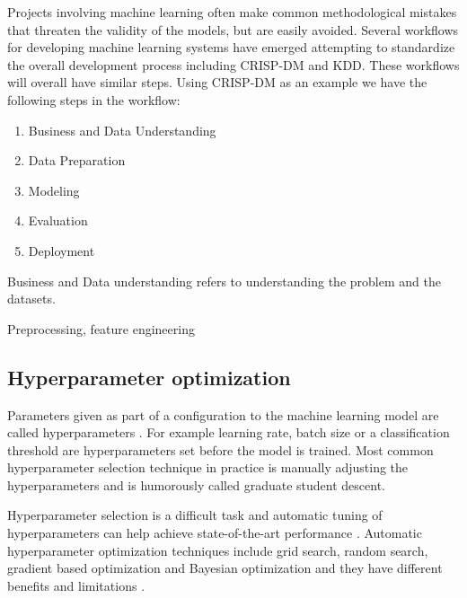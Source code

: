 Projects involving machine learning often make common methodological mistakes that threaten the validity of the models, but are easily avoided. %
Several workflows for developing machine learning systems have emerged attempting to standardize the overall development process including CRISP-DM and KDD. %
These workflows will overall have similar steps. Using CRISP-DM as an example we have the following steps in the workflow: %

\begin{enumerate}
    \item Business and Data Understanding
    \item Data Preparation
    \item Modeling
    \item Evaluation
    \item Deployment
\end{enumerate}



Business and Data understanding refers to understanding the problem and the datasets. %


Preprocessing, feature engineering





\subsection{Hyperparameter optimization}

Parameters given as part of a configuration to the machine learning model are called hyperparameters \parencite{yangHyperparameterOptimizationMachine2020}. 
For example learning rate, batch size or a classification threshold are hyperparameters set before the model is trained. 
Most common hyperparameter selection technique in practice is manually adjusting the hyperparameters and is humorously called graduate student descent. %

Hyperparameter selection is a difficult task and automatic tuning of hyperparameters can help achieve state-of-the-art performance \parencite{maclaurinGradientbasedHyperparameterOptimization2015}.
Automatic hyperparameter optimization techniques include grid search, random search, gradient based optimization and Bayesian optimization and they have different benefits and limitations \parencite{yangHyperparameterOptimizationMachine2020}.

